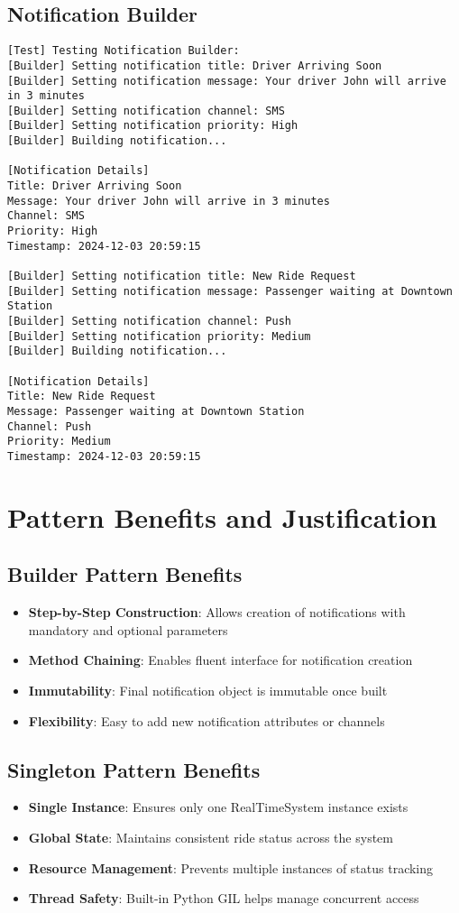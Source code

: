 \documentclass[12pt]{article}
\begin{document}
\subsection{Notification Builder}
\begin{verbatim}
[Test] Testing Notification Builder:
[Builder] Setting notification title: Driver Arriving Soon
[Builder] Setting notification message: Your driver John will arrive in 3 minutes
[Builder] Setting notification channel: SMS
[Builder] Setting notification priority: High
[Builder] Building notification...

[Notification Details]
Title: Driver Arriving Soon
Message: Your driver John will arrive in 3 minutes
Channel: SMS
Priority: High
Timestamp: 2024-12-03 20:59:15

[Builder] Setting notification title: New Ride Request
[Builder] Setting notification message: Passenger waiting at Downtown Station
[Builder] Setting notification channel: Push
[Builder] Setting notification priority: Medium
[Builder] Building notification...

[Notification Details]
Title: New Ride Request
Message: Passenger waiting at Downtown Station
Channel: Push
Priority: Medium
Timestamp: 2024-12-03 20:59:15
\end{verbatim}


\section{Pattern Benefits and Justification}

\subsection{Builder Pattern Benefits}
\begin{itemize}
    \item \textbf{Step-by-Step Construction}: Allows creation of notifications with mandatory and optional parameters
    \item \textbf{Method Chaining}: Enables fluent interface for notification creation
    \item \textbf{Immutability}: Final notification object is immutable once built
    \item \textbf{Flexibility}: Easy to add new notification attributes or channels
\end{itemize}

\subsection{Singleton Pattern Benefits}
\begin{itemize}
    \item \textbf{Single Instance}: Ensures only one RealTimeSystem instance exists
    \item \textbf{Global State}: Maintains consistent ride status across the system
    \item \textbf{Resource Management}: Prevents multiple instances of status tracking
    \item \textbf{Thread Safety}: Built-in Python GIL helps manage concurrent access
\end{itemize}
\end{document}
